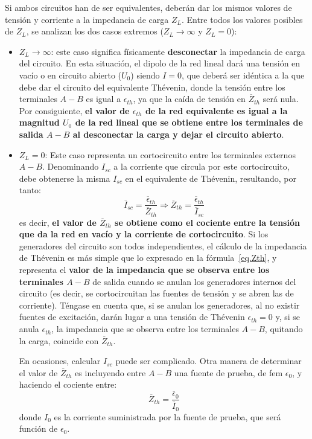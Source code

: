     
Si ambos circuitos han de ser equivalentes, deberán dar los mismos
valores de tensión y corriente a la impedancia de carga $Z_L$. Entre
todos los valores posibles de $Z_L$, se analizan los dos casos
extremos ($Z_L \to \infty$ y $Z_L=0$):
\begin{itemize}
\item $Z_L \to \infty$: este caso significa físicamente
  \textbf{desconectar} la impedancia de carga del circuito. En esta
  situación, el dipolo de la red lineal dará una tensión en vacío o en
  circuito abierto ($U_0$) siendo $I=0$, que deberá ser idéntica a la
  que debe dar el circuito del equivalente Thévenin, donde la tensión
  entre los terminales $A-B$ es igual a $\epsilon_{th}$, ya que la
  caída de tensión en $\overline{Z}_{th}$ será nula. Por consiguiente, \textbf{el
    valor de $\epsilon_{th}$ de la red equivalente es igual a la
    magnitud $U_0$ de la red lineal que se obtiene entre los
    terminales de salida $A-B$ al desconectar la carga y dejar el
    circuito abierto}.
\item $Z_L=0$: Este caso representa un cortocircuito entre los
  terminales externos $A-B$. Denominando $I_{sc}$ a la corriente que
  circula por este cortocircuito, debe obtenerse la misma $I_{sc}$ en
  el equivalente de Thévenin, resultando, por tanto:
  \begin{equation}\label{eq.Zth}
    \overline{I}_{sc}=\dfrac{\overline{\epsilon}_{th}}{\overline{Z}_{th}}\Rightarrow
    \boxed{\overline{Z}_{th}=\dfrac{\overline{\epsilon}_{th}}{\overline{I}_{sc}}}
  \end{equation}
  es decir, \textbf{el valor de $\overline{Z}_{th}$ se obtiene como el cociente
    entre la tensión que da la red en vacío y la corriente de
    cortocircuito}. Si los generadores del circuito son todos
  independientes, el cálculo de la impedancia de Thévenin es más simple
  que lo expresado en la fórmula~\eqref{eq.Zth}, y representa el
  \textbf{valor de la impedancia que se observa entre los terminales
    $A-B$} de salida cuando se anulan los generadores internos del
  circuito (es decir, se cortocircuitan las fuentes de tensión y se
  abren las de corriente). Téngase en cuenta que, si se anulan los
  generadores, al no existir fuentes de excitación, darán lugar a una
  tensión de Thévenin $\epsilon_{th}=0$ y, si se anula
  $\epsilon_{th}$, la impedancia que se observa entre los terminales
  $A-B$, quitando la carga, coincide con $\overline{Z}_{th}$.
  \begin{remark}
    En ocasiones, calcular $I_{sc}$ puede ser complicado. Otra manera
    de determinar el valor de $\overline{Z}_{th}$ es incluyendo entre $A-B$ una
    fuente de prueba, de fem $\epsilon_0$, y haciendo el cociente
    entre:
    \begin{equation*}
      \overline{Z}_{th}=\dfrac{\overline{\epsilon}_0}{\overline{I}_{0}}
    \end{equation*}
    donde $I_{0}$ es la corriente suministrada por la fuente de
    prueba, que será función de $\epsilon_0$.
  \end{remark}
\end{itemize}
     
